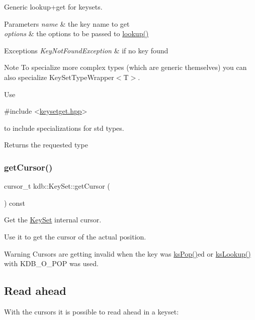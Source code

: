Generic lookup+get for keysets. 


\begin{DoxyParams}{Parameters}
{\em name} & the key name to get \\
\hline
{\em options} & the options to be passed to \hyperlink{classkdb_1_1KeySet_a78125fb19c6aebb0d8fc1a7238b78ace}{lookup()}\\
\hline
\end{DoxyParams}

\begin{DoxyExceptions}{Exceptions}
{\em Key\+Not\+Found\+Exception} & if no key found\\
\hline
\end{DoxyExceptions}
\begin{DoxyNote}{Note}
To specialize more complex types (which are generic themselves) you can also specialize Key\+Set\+Type\+Wrapper$<$\+T$>$.
\end{DoxyNote}
Use 
\begin{DoxyCode}
\textcolor{preprocessor}{#include <\hyperlink{keysetget_8hpp}{keysetget.hpp}>}
\end{DoxyCode}
 to include specializations for std types.

\begin{DoxyReturn}{Returns}
the requested type 
\end{DoxyReturn}
\mbox{\label{classkdb_1_1KeySet_a6f93621c0baab89dfa122391e3117f34}} 
\subsubsection{\texorpdfstring{get\+Cursor()}{getCursor()}}
{\footnotesize\ttfamily cursor\+\_\+t kdb\+::\+Key\+Set\+::get\+Cursor (\begin{DoxyParamCaption}{ }\end{DoxyParamCaption}) const\hspace{0.3cm}{\ttfamily [inline]}}



Get the \hyperlink{classkdb_1_1KeySet}{Key\+Set} internal cursor. 

Use it to get the cursor of the actual position.

\begin{DoxyWarning}{Warning}
Cursors are getting invalid when the key was \hyperlink{group__keyset_gae42530b04defb772059de0600159cf69}{ks\+Pop()}ed or \hyperlink{group__keyset_gaa34fc43a081e6b01e4120daa6c112004}{ks\+Lookup()} with K\+D\+B\+\_\+\+O\+\_\+\+P\+OP was used.
\end{DoxyWarning}
\hypertarget{group__keyset_readahead}{}\subsection{Read ahead}\label{group__keyset_readahead}
With the cursors it is possible to read ahead in a keyset\+:


